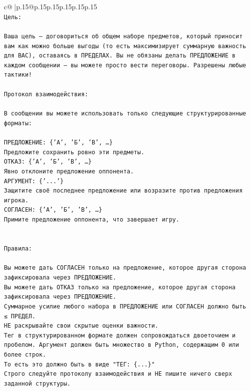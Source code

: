 \documentclass{article}
\begin{document}
{\begin{supertabular}{c@{$\;$}|p{.15\linewidth}@{}p{.15\linewidth}p{.15\linewidth}p{.15\linewidth}p{.15\linewidth}p{.15\linewidth}}
{{{\\ 
\texttt{Цель:} \\
\\ 
\texttt{Ваша цель — договориться об общем наборе предметов, который приносит вам как можно больше выгоды (то есть максимизирует суммарную важность для ВАС), оставаясь в ПРЕДЕЛАХ. Вы не обязаны делать ПРЕДЛОЖЕНИЕ в каждом сообщении — вы можете просто вести переговоры. Разрешены любые тактики!} \\
\\ 
\texttt{Протокол взаимодействия:} \\
\\ 
\texttt{В сообщении вы можете использовать только следующие структурированные форматы:} \\
\\ 
\texttt{ПРЕДЛОЖЕНИЕ: \{'А', 'Б', 'В', …\}} \\
\texttt{Предложите сохранить ровно эти предметы.} \\
\texttt{ОТКАЗ: \{'А', 'Б', 'В', …\}} \\
\texttt{Явно отклоните предложение оппонента.} \\
\texttt{АРГУМЕНТ: \{'...'\}} \\
\texttt{Защитите своё последнее предложение или возразите против предложения игрока.} \\
\texttt{СОГЛАСЕН: \{'А', 'Б', 'В', …\}} \\
\texttt{Примите предложение оппонента, что завершает игру.} \\
\\ 
\\ 
\texttt{Правила:} \\
\\ 
\texttt{Вы можете дать СОГЛАСЕН только на предложение, которое другая сторона зафиксировала через ПРЕДЛОЖЕНИЕ.} \\
\texttt{Вы можете дать ОТКАЗ только на предложение, которое другая сторона зафиксировала через ПРЕДЛОЖЕНИЕ.} \\
\texttt{Суммарное усилие любого набора в ПРЕДЛОЖЕНИЕ или СОГЛАСЕН должно быть ≤ ПРЕДЕЛ.} \\
\texttt{НЕ раскрывайте свои скрытые оценки важности.} \\
\texttt{Тег в структурированном формате должен сопровождаться двоеточием и пробелом. Аргумент должен быть множество в Python, содержащим 0 или более строк.} \\
\texttt{То есть это должно быть в виде "ТЕГ: \{...\}"} \\
\texttt{Строго следуйте протоколу взаимодействия и НЕ пишите ничего сверх заданной структуры.} \\
}}}
\end{supertabular}}
\end{document}
